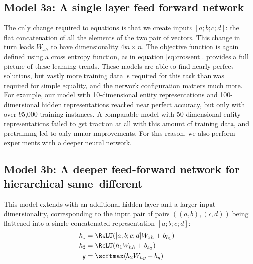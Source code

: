 \subsection{Model 3a: A single layer feed forward network }
 The only change required to equations  is that we create inputs $[a;b;c;d]$: the flat concatenation of all the elements of the two pair of vectors. This change in turn leads $W_{xh}$ to have dimensionality $4m \times n$. The objective function is again defined using a cross entropy function, as in equation \ref{eq:crossent}.  provides a full picture of these learning trends. These models are able to find nearly perfect solutions, but vastly more training data is required for this task than was required for simple equality, and the network configuration matters much more. For example, our model with 10-dimensional entity representations and 100-dimensional hidden representations reached near perfect accuracy, but only with over 95,000 training instances. A comparable model with 50-dimensional entity representations failed to get traction at all with this amount of training data, and pretraining led to only minor improvements. For this reason, we also perform experiments with a deeper neural network.


\subsection{Model 3b: A deeper feed-forward network for hierarchical same--different}\label{sec:model3a}



This model extends  with an additional hidden layer and a larger input dimensionality, corresponding to the input pair of pairs $((a,b), (c,d))$ being flattened into a single concatenated representation $[a;b;c;d]$:
%
\begin{align}
  h_{1} &= \ReLU([a;b;c;d]W_{xh} + b_{h_{1}}) \label{eq:x2h1-supp}\\
  h_{2} &= \ReLU(h_{1}W_{hh} + b_{h_{2}}) \label{eq:x2h2-supp}\\
  y &= \softmax(h_{2}W_{hy} + b_{y}) \label{eq:h2y2-supp}
\end{align}
%

